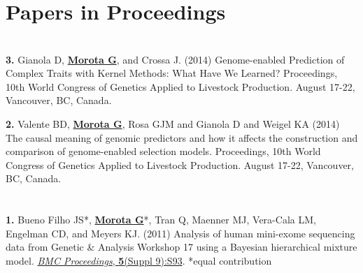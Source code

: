 \documentclass[margin,line,10pt]{res}
\newenvironment{list1}{
  \begin{list}{\ding{113}}{%
      \setlength{\itemsep}{0in}
      \setlength{\parsep}{0in} \setlength{\parskip}{0in}
      \setlength{\topsep}{0in} \setlength{\partopsep}{0in} 
      \setlength{\leftmargin}{0.17in}}}{\end{list}}
\begin{document}
\begin{resume}
\vspace{0.5cm}
\section{\sc Papers in Proceedings}
\vspace{0.9cm}
\section{}
\begin{list1}
\item [\bf{3}.] Gianola D, {\bf \underline{Morota G}}, and Crossa J. (2014) 
Genome-enabled Prediction of Complex Traits with Kernel Methods: What Have We Learned? 
Proceedings, 10th World Congress of Genetics Applied to Livestock Production. August 17-22, Vancouver, BC, Canada. 

\vspace{0.5cm}

\item [\bf{2}.] Valente BD, {\bf \underline{Morota G}}, Rosa GJM and Gianola D and  Weigel KA (2014) 
The causal meaning of genomic predictors and how it affects the construction and comparison of genome-enabled selection models. 
Proceedings, 10th World Congress of Genetics Applied to Livestock Production. August 17-22, Vancouver, BC, Canada. 
\end{list1}

\section{}
\begin{list1}
\item [\bf{1}.] Bueno Filho JS*, {\bf \underline{Morota G}}*, Tran Q, Maenner MJ, Vera-Cala LM, Engelman CD, and Meyers KJ. (2011) Analysis of human mini-exome sequencing data from Genetic \& Analysis Workshop 17 using a  Bayesian hierarchical mixture model.  \textcolor{blue}{\href{http://www.biomedcentral.com/1753-6561/5/S9/S93}{{\it BMC Proceedings}, {\bf 5}(Suppl 9):S93}}. *equal contribution  
\end{list1}








\vspace{0.5cm}

\end{resume}
\end{document}
